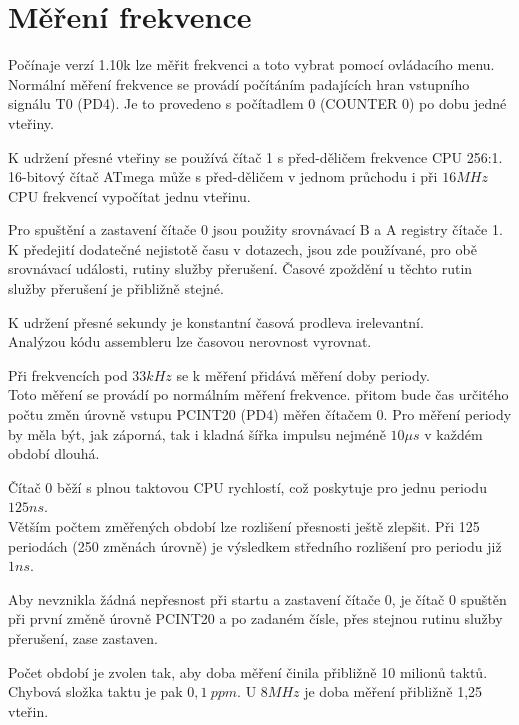
\section{Měření frekvence}
\label{sec:frequency}

Počínaje verzí 1.10k lze měřit frekvenci a toto vybrat pomocí ovládacího menu.
\\Normální měření frekvence se provádí počítáním padajících hran vstupního signálu T0 (PD4).
Je to provedeno s počítadlem 0 (COUNTER 0) po dobu jedné vteřiny.

K udržení přesné vteřiny se používá čítač 1 s před-děličem frekvence CPU 256:1.
\\16-bitový čítač ATmega může s před-děličem v jednom průchodu i při \(16MHz\) CPU frekvencí vypočítat jednu vteřinu.

Pro spuštění a zastavení čítače 0 jsou použity srovnávací B a A registry čítače 1.
\\K předejití dodatečné nejistotě času v dotazech, jsou zde  používané, pro obě srovnávací události, rutiny služby přerušení. Časové zpoždění u těchto rutin služby přerušení je přibližně stejné.

K udržení přesné sekundy je konstantní časová prodleva irelevantní.
\\Analýzou kódu assembleru lze časovou nerovnost vyrovnat.

Při frekvencích pod \(33kHz\) se k měření přidává měření doby periody.
\\Toto měření se provádí po normálním měření frekvence.
přitom bude čas určitého počtu změn úrovně vstupu PCINT20 (PD4) měřen čítačem 0.
Pro měření periody by měla být, jak záporná, tak i kladná šířka impulsu nejméně \(10\mu s\)  v každém období dlouhá.

Čítač 0 běží s plnou taktovou CPU rychlostí, což poskytuje pro jednu periodu \(125ns\).
\\Větším počtem změřených období lze rozlišení přesnosti ještě zlepšit. Při 125 periodách (250 změnách úrovně) je výsledkem středního rozlišení pro periodu již \(1ns\).

Aby nevznikla žádná nepřesnost při startu a zastavení čítače 0, je čítač 0 spuštěn při první změně úrovně
PCINT20 a po zadaném čísle, přes stejnou rutinu služby přerušení, zase zastaven.

Počet období je zvolen tak, aby doba měření činila přibližně 10 milionů taktů.\\
Chybová složka taktu je pak \(0,1~ppm\). U \(8MHz\) je doba měření přibližně 1,25 vteřin.

